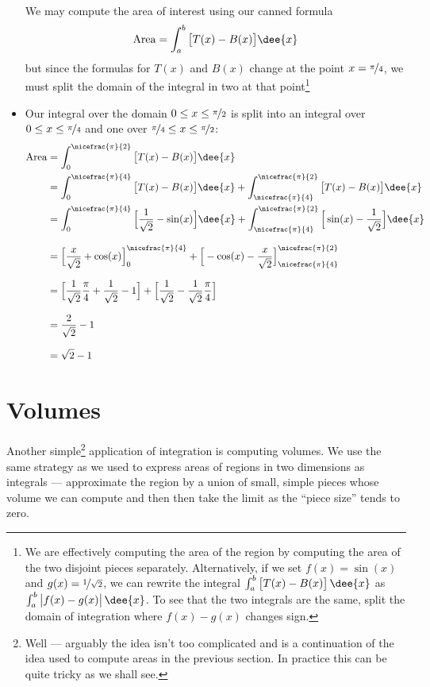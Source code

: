\begin{eg}
\begin{itemize}
\begin{align*}
\end{align*}
We may compute the area of interest using our canned formula
\begin{align*}
\text{Area} = \int_a^b \big[T(x)-B(x)\big]\dee{x}
\end{align*}
but since the formulas for $T(x)$ and $B(x)$ change at the point $x=\nicefrac{\pi}{4}$,
we must split the domain of the integral in two at that point\footnote{We are
effectively computing the area of the region by computing the area of the two disjoint
pieces separately. Alternatively, if we set $f(x) = \sin(x)$ and $g(x)
=\nicefrac{1}{\sqrt{2}}$, we can rewrite the integral $\int_a^b \big[T(x) -
B(x)\big]\,\dee{x}$ as $\int_a^b \big|f(x) - g(x)\big|\,\dee{x}$. To see that the two
integrals are the same, split the domain of integration where $f(x)-g(x)$ changes sign.}

\item Our integral over the domain $0\leq x \leq \nicefrac{\pi}{2}$ is split into an
integral over $0\le x\le \nicefrac{\pi}{4}$ and one over $\nicefrac{\pi}{4}\le x\le
\nicefrac{\pi}{2}$:
\begin{align*}
\text{Area} &= \int_0^{\nicefrac{\pi}{2}} \big[T(x)-B(x)\big]\dee{x} \\
   &= \int_0^{\nicefrac{\pi}{4}} \big[T(x)-B(x)\big]\dee{x}
      +\int_{\nicefrac{\pi}{4}}^{\nicefrac{\pi}{2}} \big[T(x)-B(x)\big]\dee{x} \\
   &= \int_0^{\nicefrac{\pi}{4}} \Big[\frac{1}{\sqrt{2}}-\sin(x)\Big]\dee{x}
      +\int_{\nicefrac{\pi}{4}}^{\nicefrac{\pi}{2}}
                       \Big[\sin(x)-\frac{1}{\sqrt{2}}\Big]\dee{x} \\[0.1in]
   &= \Big[\frac{x}{\sqrt{2}}+\cos(x)\Big]_0^{\nicefrac{\pi}{4}}
      +\Big[-\cos(x)-\frac{x}{\sqrt{2}}\Big]
                _{\nicefrac{\pi}{4}}^{\nicefrac{\pi}{2}}  \\[0.1in]
   &= \Big[\frac{1}{\sqrt{2}}\frac{\pi}{4}+\frac{1}{\sqrt{2}}-1\Big]
      +\Big[\frac{1}{\sqrt{2}}-\frac{1}{\sqrt{2}}\frac{\pi}{4}\Big]  \\[0.1in]
  &=\frac{2}{\sqrt{2}}-1 \\[0.1in]
  &=\sqrt{2}-1
\end{align*}

\end{itemize}

\end{eg}

\section{Volumes}\label{sec int volumes}
Another simple\footnote{Well --- arguably the idea isn't too complicated and is a
continuation of the idea used to compute areas in the previous section. In practice this
can be quite tricky as we shall see.} application of integration is computing volumes. We
use the same strategy as we used to express areas of regions in two
dimensions as integrals --- approximate the region by a union of small,
simple pieces whose volume we can compute and then then take the limit
as the ``piece size'' tends to zero.

